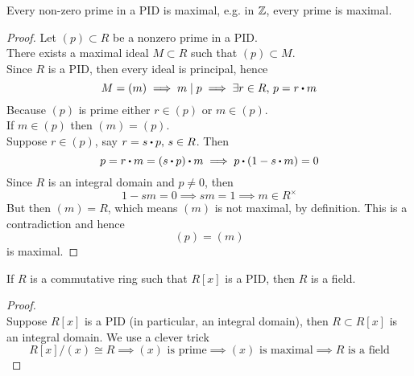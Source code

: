 \documentclass[../Main.tex]{subfiles}
\begin{document}
\begin{thm}
	Every non-zero prime in a PID is maximal, e.g. in $\mathbb{Z}$, every prime is maximal.
\end{thm}
\begin{proof}
	Let $(p)\subset R$ be a nonzero prime in a PID.\\
	There exists a maximal ideal $M\subset R $ such that $(p)\subset M$.\\
	Since $R$ is a PID, then every ideal is principal, hence
	\[M=(m) \implies m\mid p \implies \exists r\in R, \, p=r\rdot m\]
	Because $(p)$ is prime either $r\in (p)$ or $m \in (p)$.\\
	If $m\in (p)$ then $(m)=(p)$. \\
	Suppose $r\in (p)$, say $r=s\rdot p,\, s\in R$. Then 
	\[p=r\rdot m=(s\rdot p)\rdot m \implies p\rdot (1-s\rdot m)=0\]
	Since $R$ is an integral domain and $p\ne 0$, then 
	\[1-sm=0\implies sm =1 \implies  m\in R^\times\]
	But then $(m) = R$, which means $(m)$ is not maximal, by definition. This is a contradiction and hence 
	\[(p)=(m)\]
	is maximal.
\end{proof}
\begin{thm}
	If $R$ is a commutative ring such that $R[x]$ is a PID, then $R$ is a field.
\end{thm}
\begin{proof}~\\
	Suppose $R[x]$ is a PID (in particular, an integral domain), then $R\subset R[x]$ is an integral domain. We use a clever trick
	\[R[x]/(x) \cong R \implies (x) \text{ is prime} \implies (x) \text{ is maximal} \implies R \text{ is a field}\]
\end{proof}
\end{document}
